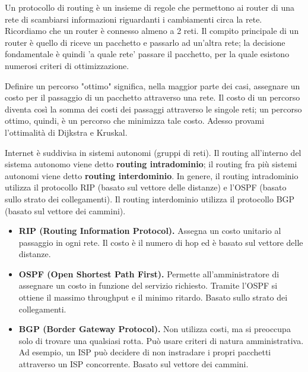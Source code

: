         Un protocollo di routing è un insieme di regole che permettono ai router di una rete di scambiarsi informazioni riguardanti i cambiamenti circa la rete. Ricordiamo che un router è connesso almeno a 2 reti. Il compito principale di un router è quello di riceve un pacchetto e passarlo ad un'altra rete; la decisione fondamentale è quindi 'a quale rete' passare il pacchetto, per la quale esistono numerosi criteri di ottimizzazione.
        
        Definire un percorso "ottimo" significa, nella maggior parte dei casi, assegnare un costo per il passaggio di un pacchetto attraverso una rete. Il costo di un percorso diventa così la somma dei costi dei passaggi attraverso le singole reti; un percorso ottimo, quindi, è un percorso che minimizza tale costo. Adesso provami l'ottimalità di Dijkstra e Kruskal.
        
        \vspace{3mm}
        
        Internet è suddivisa in sistemi autonomi (gruppi di reti). Il routing all'interno del sistema autonomo viene detto \textbf{routing intradominio}; il routing fra più sistemi autonomi viene detto \textbf{routing interdominio}. In genere, il routing intradominio utilizza il protocollo RIP (basato sul vettore delle distanze) e l'OSPF (basato sullo strato dei collegamenti). Il routing interdominio utilizza il protocollo BGP (basato sul vettore dei cammini).
        
        \begin{itemize}
            \item 
                \textbf{RIP (Routing Information Protocol).} Assegna un costo unitario al passaggio in ogni rete. Il costo è il numero di hop ed è basato sul vettore delle distanze.
            
            \item
                \textbf{OSPF (Open Shortest Path First).} Permette all'amministratore di assegnare un costo in funzione del servizio richiesto. Tramite l'OSPF si ottiene il massimo throughput e il minimo ritardo. Basato sullo strato dei collegamenti.
                
            \item
                \textbf{BGP (Border Gateway Protocol).} Non utilizza costi, ma si preoccupa solo di trovare una qualsiasi rotta. Può usare criteri di natura amministrativa. Ad esempio, un ISP può decidere di non instradare i propri pacchetti attraverso un ISP concorrente. Basato sul vettore dei cammini.
        \end{itemize}
        
